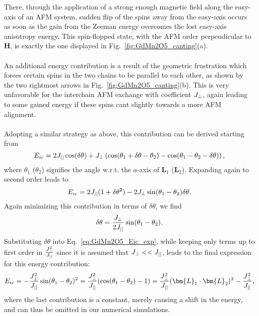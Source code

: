 There, through the application of a strong enough magnetic field along the easy-axis of an AFM system, sudden flip of the spins away from the easy-axis occurs as soon as the gain from the Zeeman energy overcomes the lost easy-axis anisotropy energy. This spin-flopped state, with the AFM order perpendicular to $\bm{H}$, is exactly the one displayed in Fig.~\ref{fig:GdMn2O5_canting}(a).
\\\\
An additional energy contribution is a result of the geometric frustration which forces certain spins in the two chains to be parallel to each other, as shown by the two rightmost arrows in Fig.~\ref{fig:GdMn2O5_canting}(b).
This is very unfavorable for the interchain AFM exchange with coefficient $J_{\perp}$, again leading to some gained energy if these spins cant slightly towards a more AFM alignment.
\\\\
Adopting a similar strategy as above, this contribution can be derived starting from
\begin{equation}
	E_{ic} = 2 J_{||} \cos(\delta \theta) + J_{\perp} \left(\cos(\theta_1 + \delta \theta - \theta_2) - \cos(\theta_1 - \theta_2 -\delta \theta)\right),
\end{equation}
where $\theta_1$ ($\theta_2$) signifies the angle w.r.t. the $a$-axis of $\bm{L}_1$ ($\bm{L}_2$).
Expanding again to second order leads to
\begin{equation}
	E_{ic} = 2 J_{||} ( 1+ \delta \theta^2) - 2 J_{\perp} \sin(\theta_1 - \theta_2)\delta \theta. \label{eq:GdMn2O5_Eic_exp}
\end{equation}
Again minimizing this contribution in terms of $\delta \theta$, we find
\begin{equation}
	\delta \theta = \frac{J_{\perp}}{2 J_{||}} \sin(\theta_1 - \theta_2).
\end{equation}
Substituting $\delta \theta$ into Eq.~\eqref{eq:GdMn2O5_Eic_exp}, while keeping only terms up to first order in $\frac{J_{\perp}^2}{J_{||}}$ since it is assumed that $J_{\perp} << J_{||}$, leads to the final expression for this energy contribution:
\begin{equation}
	E_{ic} = -\frac{\Jperp^2}{\Jpar}\sin(\theta_1 - \theta_2)^2 =  \frac{\Jperp^2}{\Jpar}(\cos(\theta_1 - \theta_2) - 1) = \frac{\Jperp^2}{\Jpar}(\bm{L}_1 \cdot \bm{L}_2)^2 - \frac{\Jperp^2}{\Jpar},
\end{equation}
where the last contribution is a constant, merely causing a shift in the energy, and can thus be omitted in our numerical simulations.
